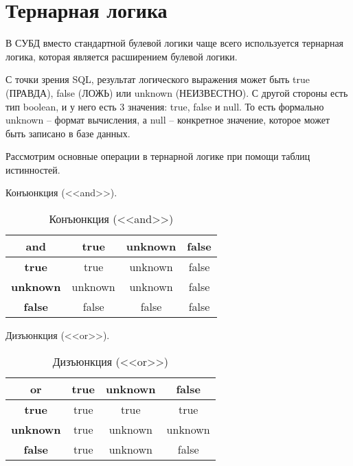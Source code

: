 \section{Тернарная логика}

В СУБД вместо стандартной булевой логики чаще всего используется тернарная логика, которая является расширением булевой логики. 

С точки зрения SQL, результат логического выражения может быть true (ПРАВДА), false (ЛОЖЬ) или unknown (НЕИЗВЕСТНО). С другой стороны есть тип boolean, и у него есть 3 значения: true, false и null. То есть формально unknown -- формат вычисления, а null -- конкретное значение, которое может быть записано в базе данных.

Рассмотрим основные операции в тернарной логике при помощи таблиц истинностей.


Конъюнкция (<<and>>).
\begin{table}[!h]	
	\begin{center}
		\captionsetup{justification=raggedleft,singlelinecheck=off}
		\caption{Конъюнкция (<<and>>)} 
		\begin{tabular}[c]{|c|c|c|c|}
			\hline
			\textbf{and} & \textbf{true} & \textbf{unknown} & \textbf{false}\\
			\hline
			\textbf{true} & true & unknown & false\\
			\hline
			\textbf{unknown} & unknown & unknown & false \\
			\hline
			\textbf{false} & false & false & false \\
			\hline
		\end{tabular}
	\end{center}
\end{table}

Дизъюнкция (<<or>>).
\begin{table}[!h]
	\begin{center}
		\captionsetup{justification=raggedleft,singlelinecheck=off}
		\caption{Дизъюнкция (<<or>>)} 
		\begin{tabular}[c]{|c|c|c|c|}
			\hline
			\textbf{or} & \textbf{true} & \textbf{unknown} & \textbf{false}\\
			\hline
			\textbf{true} & true & true & true\\
			\hline
			\textbf{unknown} & true & unknown & unknown \\
			\hline
			\textbf{false} & true & unknown & false \\
			\hline
		\end{tabular}
	\end{center}
\end{table}

